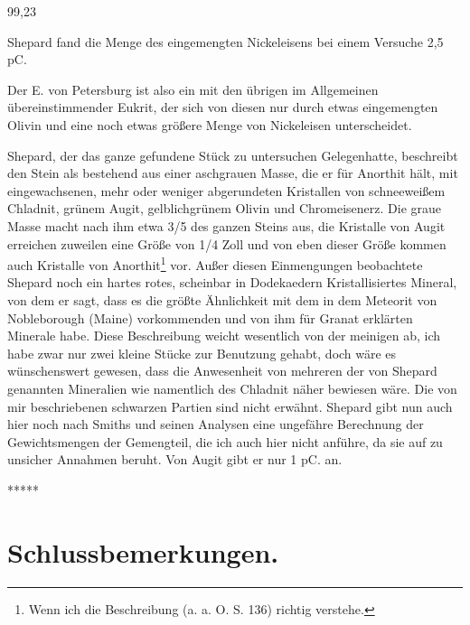 \documentclass[a4paper, 11pt, oneside]{article}
\begin{document}
99,23  

Shepard fand die Menge des eingemengten Nickeleisens bei einem Versuche 2,5 pC.

Der E. von Petersburg ist also ein mit den übrigen im Allgemeinen übereinstimmender Eukrit, der sich von diesen nur durch etwas eingemengten Olivin und eine noch etwas größere Menge von Nickeleisen unterscheidet.

Shepard, der das ganze gefundene Stück zu untersuchen Gelegenhatte, beschreibt den Stein als bestehend aus einer aschgrauen Masse, die er für Anorthit hält, mit eingewachsenen, mehr oder weniger abgerundeten Kristallen von schneeweißem Chladnit, grünem Augit, gelblichgrünem Olivin und Chromeisenerz. Die graue Masse macht nach ihm etwa 3/5 des ganzen Steins aus, die Kristalle von Augit erreichen zuweilen eine Größe von 1/4 Zoll und von eben dieser Größe kommen auch Kristalle von Anorthit\footnote{Wenn ich die Beschreibung (a. a. O. S. 136) richtig verstehe.} vor. Außer diesen Einmengungen beobachtete Shepard noch ein hartes rotes, scheinbar in Dodekaedern Kristallisiertes Mineral, von dem er sagt, dass es die größte Ähnlichkeit mit dem in dem Meteorit von Nobleborough (Maine) vorkommenden und von ihm für Granat erklärten Minerale habe. Diese Beschreibung weicht wesentlich von der meinigen ab, ich habe zwar nur zwei kleine Stücke zur Benutzung gehabt, doch wäre es wünschenswert gewesen, dass die Anwesenheit von mehreren der von Shepard genannten Mineralien wie namentlich des Chladnit näher bewiesen wäre. Die von mir beschriebenen schwarzen Partien sind nicht erwähnt. Shepard gibt nun auch hier noch nach Smiths und seinen Analysen eine ungefähre Berechnung der Gewichtsmengen der Gemengteil, die ich auch hier nicht anführe, da sie auf zu unsicher Annahmen beruht. Von Augit gibt er nur 1 pC. an.

\centerline{*\hspace{15mm}*\hspace{15mm}*\hspace{15mm}*\hspace{15mm}*}
\clearpage
\section{Schlussbemerkungen.}
\paragraph{}
\end{document}
